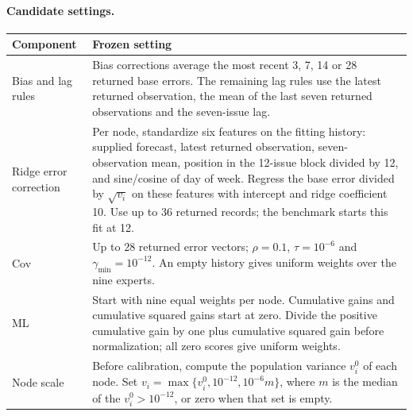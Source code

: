 \paragraph{Candidate settings.}
\begin{center}\small
\begin{tabular}{@{}p{.27\linewidth}p{.65\linewidth}@{}}
\toprule
Component & Frozen setting\\\midrule
Bias and lag rules & Bias corrections average the most recent 3, 7, 14 or 28 returned base errors. The remaining lag rules use the latest returned observation, the mean of the last seven returned observations and the seven-issue lag.\\
Ridge error correction & Per node, standardize six features on the fitting history: supplied forecast, latest returned observation, seven-observation mean, position in the 12-issue block divided by 12, and sine/cosine of day of week. Regress the base error divided by $\sqrt{v_i}$ on these features with intercept and ridge coefficient 10. Use up to 36 returned records; the benchmark starts this fit at 12.\\
Cov & Up to 28 returned error vectors; $\rho=0.1$, $\tau=10^{-6}$ and $\gamma_{\min}=10^{-12}$. An empty history gives uniform weights over the nine experts.\\
ML & Start with nine equal weights per node. Cumulative gains and cumulative squared gains start at zero. Divide the positive cumulative gain by one plus cumulative squared gain before normalization; all zero scores give uniform weights.\\
Node scale & Before calibration, compute the population variance $v_i^0$ of each node. Set $v_i=\max\{v_i^0,10^{-12},10^{-6}m\}$, where $m$ is the median of the $v_i^0>10^{-12}$, or zero when that set is empty.\\
\bottomrule
\end{tabular}
\end{center}

